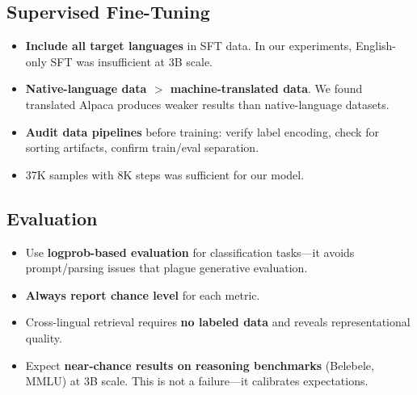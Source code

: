 \documentclass[10pt,twocolumn]{article}
\begin{document}
\subsection{Supervised Fine-Tuning}

\begin{itemize}
    \item \textbf{Include all target languages} in SFT data. In our experiments, English-only SFT was insufficient at 3B scale.
    \item \textbf{Native-language data $>$ machine-translated data}. We found translated Alpaca produces weaker results than native-language datasets.
    \item \textbf{Audit data pipelines} before training: verify label encoding, check for sorting artifacts, confirm train/eval separation.
    \item 37K samples with 8K steps was sufficient for our model.
\end{itemize}

\subsection{Evaluation}

\begin{itemize}
    \item Use \textbf{logprob-based evaluation} for classification tasks---it avoids prompt/parsing issues that plague generative evaluation.
    \item \textbf{Always report chance level} for each metric.
    \item Cross-lingual retrieval requires \textbf{no labeled data} and reveals representational quality.
    \item Expect \textbf{near-chance results on reasoning benchmarks} (Belebele, MMLU) at 3B scale. This is not a failure---it calibrates expectations.
\end{itemize}
\end{document}
